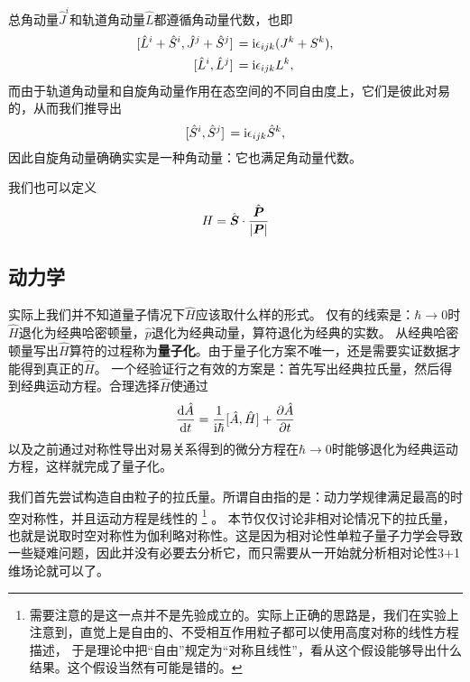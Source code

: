\documentclass[hyperref, UTF8, a4paper]{ctexart}
\newcommand*{\ii}{\mathrm{i}}
\begin{document}
总角动量$\hat{J}^i$和轨道角动量$\hat{L}$都遵循角动量代数，也即
\[
    \begin{aligned}
        \comm*{\hat{L}^i+\hat{S}^i}{\hat{J}^j+\hat{S}^j} &= \ii \epsilon_{ijk} (J^k+S^k), \\
        \comm*{\hat{L}^i}{\hat{L}^j} &= \ii \epsilon_{ijk} L^k,
    \end{aligned}
\]
而由于轨道角动量和自旋角动量作用在态空间的不同自由度上，它们是彼此对易的，从而我们推导出
\[
    \comm*{\hat{S}^i}{\hat{S}^j} = \ii \epsilon_{ijk} \hat{S}^k,
\]
因此自旋角动量确确实实是一种角动量：它也满足角动量代数。

我们也可以定义
\begin{equation}
    H = \hat{\vb*{S}} \cdot \frac{\hat{\vb*{P}}}{\abs{\vb*{P}}}
\end{equation}


\subsection{动力学}

实际上我们并不知道量子情况下$\hat{H}$应该取什么样的形式。
仅有的线索是：$\hbar \to 0$时$\hat{H}$退化为经典哈密顿量，$\hat{p}$退化为经典动量，算符退化为经典的实数。
从经典哈密顿量写出$\hat{H}$算符的过程称为\textbf{量子化}。由于量子化方案不唯一，还是需要实证数据才能得到真正的$\hat{H}$。
一个经验证行之有效的方案是：首先写出经典拉氏量，然后得到经典运动方程。合理选择$\hat{H}$使通过
\begin{equation}
    \dv{\hat{A}}{t} = \frac{1}{\ii \hbar} [\hat{A}, \hat{H}] + \pdv{\hat{A}}{t}
\end{equation}
以及之前通过对称性导出对易关系得到的微分方程在$\hbar \to 0$时能够退化为经典运动方程，这样就完成了量子化。

我们首先尝试构造自由粒子的拉氏量。所谓自由指的是：动力学规律满足最高的时空对称性，并且运动方程是线性的%
\footnote{
    需要注意的是这一点并不是先验成立的。实际上正确的思路是，我们在实验上注意到，直觉上是自由的、不受相互作用粒子都可以使用高度对称的线性方程描述，
    于是理论中把“自由”规定为“对称且线性”，看从这个假设能够导出什么结果。这个假设当然有可能是错的。
}%
。
本节仅仅讨论非相对论情况下的拉氏量，也就是说取时空对称性为伽利略对称性。这是因为相对论性单粒子量子力学会导致一些疑难问题，因此并没有必要去分析它，而只需要从一开始就分析相对论性3+1维场论就可以了。
\end{document}
